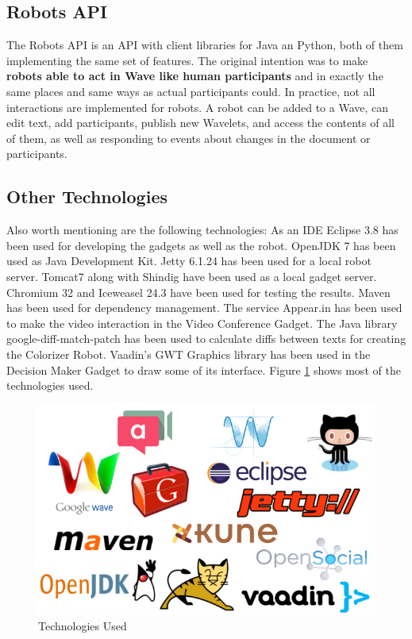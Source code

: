\subsection{Robots API}
The Robots API \cite{ref:robots_api} is an API with client libraries for Java an Python, both of them implementing the same set of features. The original intention was to make \textbf{robots able to act in Wave like human participants} and in exactly the same places and same ways as actual participants could. In practice, not all interactions are implemented for robots. A robot can be added to a Wave, can edit text, add participants, publish new Wavelets, and access the contents of all of them, as well as responding to events about changes in the document or participants.

\subsection{Other Technologies}
Also worth mentioning are the following technologies:
As an IDE Eclipse \cite{ref:eclipse} 3.8 has been used for developing the gadgets as well as the robot. OpenJDK \cite{ref:openjdk} 7 has been used as Java Development Kit. Jetty \cite{ref:jetty} 6.1.24 has been used for a local robot server. Tomcat7 \cite{ref:tomcat} along with Shindig have been used as a local gadget server. Chromium \cite{ref:chromium} 32 and Iceweasel \cite{ref:iceweasel} 24.3 have been used for testing the results. Maven \cite{ref:maven} has been used for dependency management. The service Appear.in has been used to make the video interaction in the Video Conference Gadget. The Java library google-diff-match-patch has been used to calculate diffs between texts for creating the Colorizer Robot. Vaadin's GWT Graphics library has been used in the Decision Maker Gadget to draw some of its interface. Figure \ref{fig:logos} shows most of the technologies used.
\begin{figure}[h]
  \center
    \includegraphics[keepaspectratio, scale=0.45]{Media/logos.png}
  \caption{Technologies Used}
  \label{fig:logos}
\end{figure}


